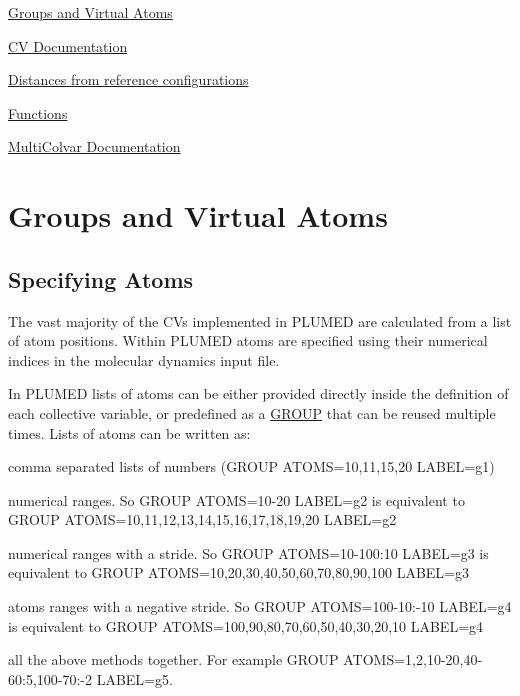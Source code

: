 \begin{DoxyItemize}
\item \hyperlink{Group}{Groups and Virtual Atoms}
\item \hyperlink{Colvar}{C\+V Documentation}
\item \hyperlink{dists}{Distances from reference configurations}
\item \hyperlink{Function}{Functions}
\item \hyperlink{mcolv}{Multi\+Colvar Documentation} 
\end{DoxyItemize}\hypertarget{Group}{}\section{Groups and Virtual Atoms}\label{Group}
\hypertarget{_group_atomSpecs}{}\subsection{Specifying Atoms}\label{_group_atomSpecs}
The vast majority of the C\+Vs implemented in P\+L\+U\+M\+E\+D are calculated from a list of atom positions. Within P\+L\+U\+M\+E\+D atoms are specified using their numerical indices in the molecular dynamics input file.

In P\+L\+U\+M\+E\+D lists of atoms can be either provided directly inside the definition of each collective variable, or predefined as a \hyperlink{GROUP}{G\+R\+O\+U\+P} that can be reused multiple times. Lists of atoms can be written as\+:


\begin{DoxyItemize}
\item comma separated lists of numbers (G\+R\+O\+U\+P A\+T\+O\+M\+S=10,11,15,20 L\+A\+B\+E\+L=g1)
\item numerical ranges. So G\+R\+O\+U\+P A\+T\+O\+M\+S=10-\/20 L\+A\+B\+E\+L=g2 is equivalent to G\+R\+O\+U\+P A\+T\+O\+M\+S=10,11,12,13,14,15,16,17,18,19,20 L\+A\+B\+E\+L=g2
\item numerical ranges with a stride. So G\+R\+O\+U\+P A\+T\+O\+M\+S=10-\/100\+:10 L\+A\+B\+E\+L=g3 is equivalent to G\+R\+O\+U\+P A\+T\+O\+M\+S=10,20,30,40,50,60,70,80,90,100 L\+A\+B\+E\+L=g3
\item atoms ranges with a negative stride. So G\+R\+O\+U\+P A\+T\+O\+M\+S=100-\/10\+:-\/10 L\+A\+B\+E\+L=g4 is equivalent to G\+R\+O\+U\+P A\+T\+O\+M\+S=100,90,80,70,60,50,40,30,20,10 L\+A\+B\+E\+L=g4
\item all the above methods together. For example G\+R\+O\+U\+P A\+T\+O\+M\+S=1,2,10-\/20,40-\/60\+:5,100-\/70\+:-\/2 L\+A\+B\+E\+L=g5.
\end{DoxyItemize}

